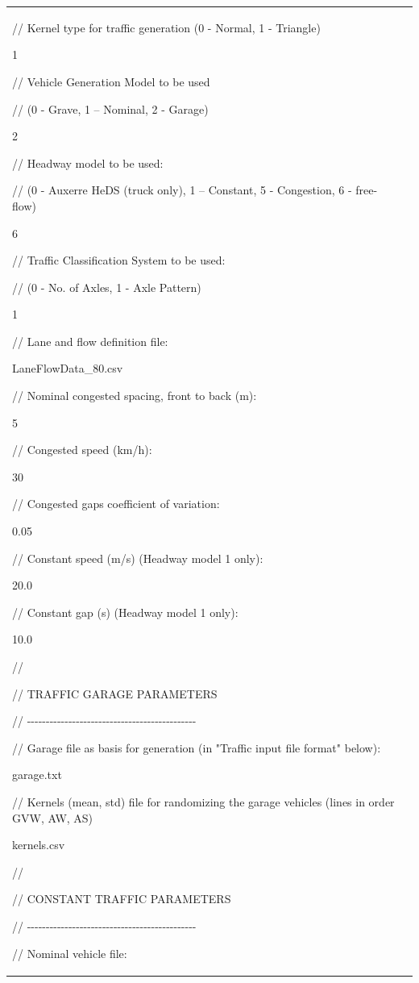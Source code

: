 \documentclass[
]{article}
\begin{document}
\begin{longtable}[]{@{}
  >{\centering\arraybackslash}p{}
  >{\raggedright\arraybackslash}p{}@{}}
0

// Kernel type for traffic generation (0 - Normal, 1 - Triangle)

1

// Vehicle Generation Model to be used

// (0 - Grave, 1 -- Nominal, 2 - Garage)

2

// Headway model to be used:

// (0 - Auxerre HeDS (truck only), 1 -- Constant, 5 - Congestion, 6 -
free-flow)

6

// Traffic Classification System to be used:

// (0 - No. of Axles, 1 - Axle Pattern)

1

// Lane and flow definition file:

LaneFlowData\_80.csv

// Nominal congested spacing, front to back (m):

5

// Congested speed (km/h):

30

// Congested gaps coefficient of variation:

0.05

// Constant speed (m/s) (Headway model 1 only):

20.0

// Constant gap (s) (Headway model 1 only):

10.0

//

// TRAFFIC GARAGE PARAMETERS

//
-\/-\/-\/-\/-\/-\/-\/-\/-\/-\/-\/-\/-\/-\/-\/-\/-\/-\/-\/-\/-\/-\/-\/-\/-\/-\/-\/-\/-\/-\/-\/-\/-\/-\/-\/-\/-\/-\/-\/-\/-\/-\/-\/-\/-

// Garage file as basis for generation (in "Traffic input file format"
below):

garage.txt

// Kernels (mean, std) file for randomizing the garage vehicles (lines
in order GVW, AW, AS)

kernels.csv

//

// CONSTANT TRAFFIC PARAMETERS

//
-\/-\/-\/-\/-\/-\/-\/-\/-\/-\/-\/-\/-\/-\/-\/-\/-\/-\/-\/-\/-\/-\/-\/-\/-\/-\/-\/-\/-\/-\/-\/-\/-\/-\/-\/-\/-\/-\/-\/-\/-\/-\/-\/-\/-

// Nominal vehicle file:


\end{longtable}
\end{document}
